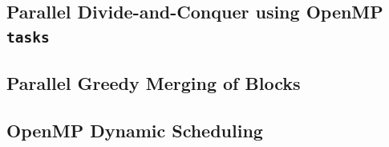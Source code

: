 \subsection{Parallel Divide-and-Conquer using OpenMP \texttt{tasks}}
\subsection{Parallel Greedy Merging of Blocks}
\subsection{OpenMP Dynamic Scheduling}


